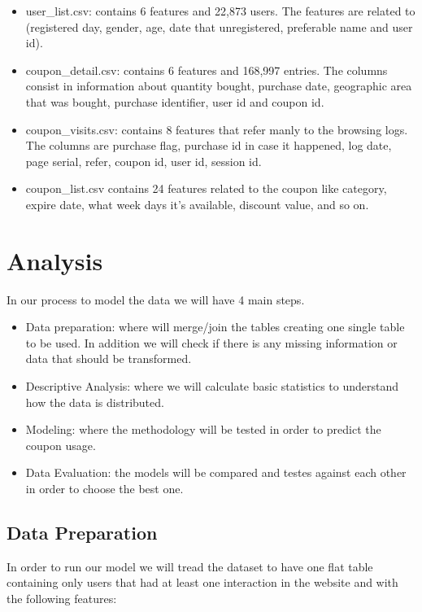 \documentclass[]{article}
\begin{document}
\begin{itemize}
\itemsep1pt\parskip0pt
\item
  user\_list.csv: contains 6 features and 22,873 users. The features are
  related to (registered day, gender, age, date that unregistered,
  preferable name and user id).
\item
  coupon\_detail.csv: contains 6 features and 168,997 entries. The
  columns consist in information about quantity bought, purchase date,
  geographic area that was bought, purchase identifier, user id and
  coupon id.
\item
  coupon\_visits.csv: contains 8 features that refer manly to the
  browsing logs. The columns are purchase flag, purchase id in case it
  happened, log date, page serial, refer, coupon id, user id, session
  id.
\item
  coupon\_list.csv contains 24 features related to the coupon like
  category, expire date, what week days it's available, discount value,
  and so on.
\end{itemize}

\section{Analysis}\label{analysis}

In our process to model the data we will have 4 main steps.

\begin{itemize}
\itemsep1pt\parskip0pt
\item
  Data preparation: where will merge/join the tables creating one single
  table to be used. In addition we will check if there is any missing
  information or data that should be transformed.
\item
  Descriptive Analysis: where we will calculate basic statistics to
  understand how the data is distributed.
\item
  Modeling: where the methodology will be tested in order to predict the
  coupon usage.
\item
  Data Evaluation: the models will be compared and testes against each
  other in order to choose the best one.
\end{itemize}

\subsection{Data Preparation}\label{data-preparation}

In order to run our model we will tread the dataset to have one flat
table containing only users that had at least one interaction in the
website and with the following features:
\end{document}
